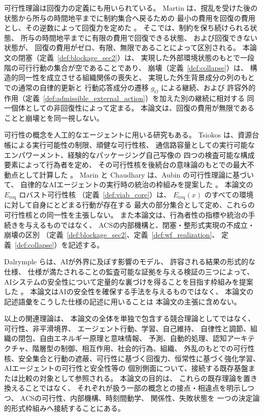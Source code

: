 可行性理論は回復力の定義にも用いられている。
Martin は、撹乱を受けた後の状態から所与の時間地平までに制約集合へ戻るための
最小の費用を回復の費用とし、その逆数によって回復力を定めた
\cite{Martin2004}。
そこでは、制約を保ち続けられる状態、
所与の時間地平までに有限の費用で回復できる状態、
および回復できない状態が、
回復の費用がゼロ、有限、無限であることによって区別される。
本論文の閉塞（定義~\ref{def:blockage_sec2}）は、
実現した外部環境状態のもとで一段階の可行行動の集合が空であることであり、
崩壊（定義~\ref{def:collapse}）は、
構造的同一性を成立させる組織関係の喪失と、
実現した外生背景成分の列のもとでの通常の自律的更新と
行動応答成分の遷移 $g_O$ による継続、および
許容外的作用（定義~\ref{def:admissible_external_action}）を加えた別の継続に相対する
同一個体としての非回復性によって定まる。
本論文は、回復の費用が無限であることと崩壊とを同一視しない。

可行性の概念を人工的なエージェントに用いる研究もある。
Tsiokos は、資源台帳による実行可能性の制限、頑健な可行性核、
通信路容量としての実行可能なエンパワーメント、経験的なパッケージング自己写像の
四つの検査可能な構成要素によって行為者を定め、
その可行性核を後続台の意味論のもとでの最大不動点として計算した
\cite{Tsiokos2026}。
Marin と Chaudhary は、Aubin の可行性理論に基づいて、
自律的なAIエージェントの実行時の統治の枠組みを提案した
\cite{MarinChaudhary2026}。
本論文の $E_{\mathrm{req}}$ ロバスト可行性核
（定義~\ref{def:viab_core}）は、
$E_{\mathrm{req}}(x)$ のすべての環境に対して自身にとどまる行動が存在する
最大の部分集合として定め、これらの可行性核との同一性を主張しない。
また本論文は、行為者性の指標や統治の手続きを与えるものではなく、
ACSの内部機構と、閉塞・整形式実現の不成立・崩壊の区別
（定義~\ref{def:blockage_sec2}、定義~\ref{def:wf_realization}、
定義~\ref{def:collapse}）を記述する。

Dalrymple らは、AIが外界に及ぼす影響のモデル、
許容される結果の形式的な仕様、
仕様が満たされることの監査可能な証拠を与える検証の三つによって、
AIシステムの安全性について定量的な裏づけを得ることを目指す枠組みを提案した
\cite{Dalrymple2024}。
本論文はAIの安全性を確保する手法を与えるものではなく、
本論文の記述語彙をこうした仕様の記述に用いることは
本論文の主張に含めない。

以上の関連理論は、
本論文の全体を単独で包含する競合理論としてではなく、
可行性、非平滑境界、
エージェント行動、学習、自己維持、
自律性と調節、組織の閉包、自由エネルギー原理と意味情報、
予測、自動的処理、認知アーキテクチャ、階層型の制御、相互作用、社会的行為、組織、
外乱のもとでの可行性核、安全集合と行動の遮蔽、可行性に基づく回復力、恒常性に基づく強化学習、
AIエージェントの可行性と安全性等の
個別側面について、接続する既存基盤または比較の対象として参照される。
本論文の目的は、
これらの既存理論を置き換えることではなく、
それぞれが扱う一部の概念との接点・相違点を明示しつつ、
ACSの可行性、内部機構、時刻間動学、
関係性、失敗状態を
一つの決定論的形式枠組みへ接続することにある。

